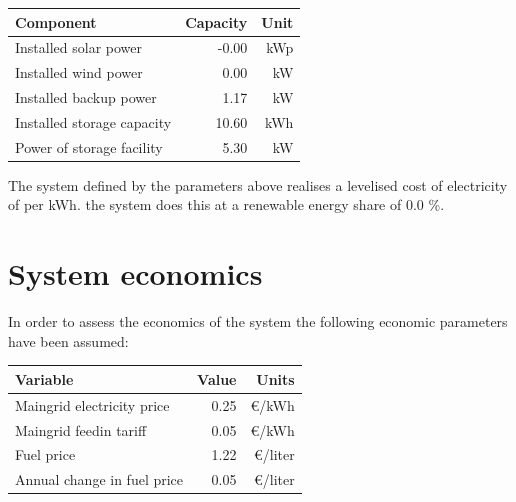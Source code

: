 \documentclass{article}
\begin{document}
\begin{multicols*}{2}
\begin{center}

\begin{tabular}{|l|r|r|}

\hline Component&Capacity&Unit\\ \hline 

Installed solar power&-0.00&kWp\\ 

Installed wind power&0.00&kW\\ 

Installed backup power&1.17&kW\\ 

Installed storage capacity&10.60&kWh\\ 

Power of storage facility&5.30&kW\\ 

\hline

\end{tabular}

\label{tab:systemlayout}

\end{center}\vspace{0.5mm}

The system defined by the parameters above realises a levelised cost of electricity of  per kWh. the system does this at a renewable energy share of 0.0 \%. 

\section*{System economics}

In order to assess the economics of the system the following economic parameters have been assumed: 

\begin{center}

\begin{tabular}{|l|r|r|}

\hline Variable&Value&Units\\ \hline 

Maingrid electricity price&0.25&\euro /kWh\\ 

Maingrid feedin tariff&0.05&\euro /kWh\\ 

Fuel price&1.22&\euro /liter\\ 

Annual change in fuel price&0.05&\euro /liter\\ 


\end{tabular}
\end{center}
\end{multicols*}
\end{document}
